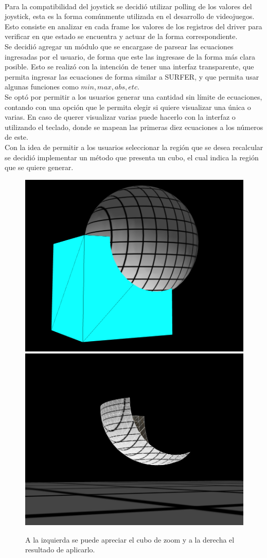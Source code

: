 \documentclass[12pt]{article}
\begin{document}
\\Para la compatibilidad del joystick se decidió utilizar polling de los valores del joystick, esta es la forma comúnmente utilizada en el desarrollo de videojuegos\cite{engine}. Esto consiste en analizar en cada frame los valores de los registros del driver para verificar en que estado se encuentra y actuar de la forma correspondiente.
\\Se decidió agregar un módulo que se encargase de parsear las ecuaciones ingresadas por el usuario, de forma que este las ingresase de la forma más clara posible. Esto se realizó con la intención de tener una interfaz transparente, que permita ingresar las ecuaciones de forma similar a SURFER, y que permita usar algunas funciones como $min, max, abs, etc$.
\\Se optó por permitir a los usuarios generar una cantidad sin límite de ecuaciones, contando con una opción que le permita elegir si quiere visualizar una única o varias. En caso de querer visualizar varias puede hacerlo con la interfaz o utilizando el teclado, donde se mapean las primeras diez ecuaciones a los números de este. 
\\Con la idea de permitir a los usuarios seleccionar la región que se desea recalcular se decidió implementar un método que presenta un cubo, el cual indica la región que se quiere generar.
\begin{figure}[h!]
\includegraphics[width =0.45\linewidth]{cubo1.png}
\hfill
\includegraphics[width =0.45\linewidth]{cubo2.png}
\caption{ A la izquierda se puede apreciar el cubo de zoom y a la derecha el resultado de aplicarlo.}
\label{ fig : surface }
\end{figure}
\end{document}

